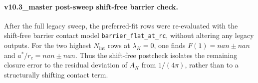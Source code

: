 \paragraph{v10.3_master post-sweep shift-free barrier check.}
After the full legacy sweep, the preferred-fit rows were re-evaluated with the shift-free barrier contact model \texttt{barrier\_flat\_at\_rc}, without altering any legacy outputs. For the two highest $N_{\mathrm{int}}$ rows at $\lambda_K=0$, one finds $F(1) = nan \pm nan$ and $a^*/r_c = nan \pm nan$. Thus the shift-free postcheck isolates the remaining closure error to the residual deviation of $A_K$ from $1/(4\pi)$, rather than to a structurally shifting contact term.
